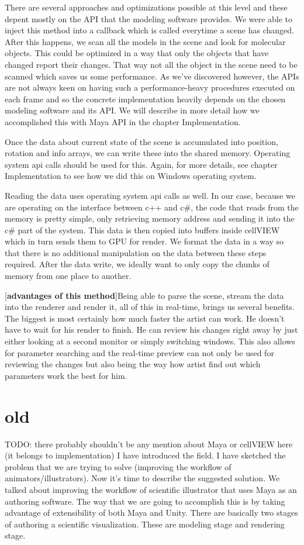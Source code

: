 \documentclass[
  digital, %
  table,   %
  nolof,     %
  nolot,     %
]{fithesis3}
\begin{document}
There are several approaches and optimizations possible at this level and these depent mostly on the API that the modeling software provides. We were able to inject this method into a callback which is called everytime a scene has changed. After this happens, we scan all the models in the scene and look for molecular objects. This could be optimized in a way that only the objects that have changed report their changes. That way not all the object in the scene need to be scanned which saves us some performance. As we've discovered however, the APIs are not always keen on having such a performance-heavy procedures executed on each frame and so the concrete implementation heavily depends on the chosen modeling software and its API. We will describe in more detail how we accomplished this with Maya API in the chapter Implementation.

Once the data about current state of the scene is accumulated into position, rotation and info arrays, we can write these into the shared memory. Operating system api calls should be used for this. Again, for more details, see chapter Implementation to see how we did this on Windows operating system.

Reading the data uses operating system api calls as well. In our case, because we are operating on the interface between c++ and c\#, the code that reads from the memory is pretty simple, only retrieving memory address and sending it into the c\# part of the system. This data is then copied into buffers inside cellVIEW which in turn sends them to GPU for render. We format the data in a way so that there is no additional manipulation on the data between these steps required. After the data write, we ideally want to only copy the chunks of memory from one place to another.

[\textbf{advantages of this method}]Being able to parse the scene, stream the data into the renderer and render it, all of this in real-time, brings us several benefits. The biggest is most certainly how much faster the artist can work. He doesn't have to wait for his render to finish. He can review his changes right away by just either looking at a second monitor or simply switching windows. This also allows for parameter searching and the real-time preview can not only be used for reviewing the changes but also being the way how artist find out which parameters work the best for him.

\section{old}
TODO: there probably shouldn't be any mention about Maya or cellVIEW here (it belongs to implementation)
I have introduced the field. I have sketched the problem that we are trying to solve (improving the workflow of animators/illustrators). Now it's time to describe the suggested solution.
We talked about improving the workflow of scientific illustrator that uses Maya as an authoring software. The way that we are going to accomplish this is by taking advantage of extensibility of both Maya and Unity. 
There are basically two stages of authoring a scientific visualization. These are modeling stage and rendering stage.
\end{document}
